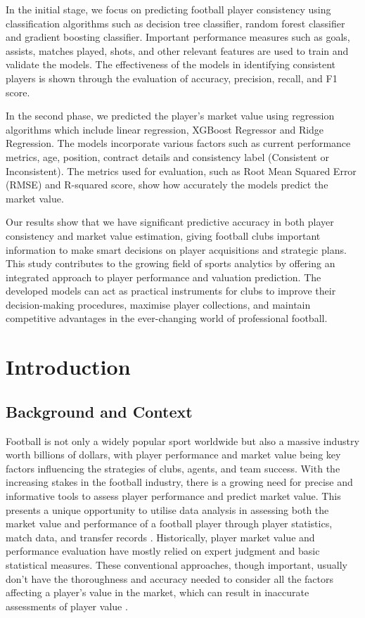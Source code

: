 \documentclass[12pt, a4paper,oneside]{book}
\numberwithin{equation}{section}
\begin{document}
In the initial stage, we focus on predicting football player consistency using classification algorithms such as decision tree classifier, random forest classifier and gradient boosting classifier. Important performance measures such as goals, assists, matches played, shots, and other relevant features are used to train and validate the models. The effectiveness of the models in identifying consistent players is shown through the evaluation of accuracy, precision, recall, and F1 score.

In the second phase, we predicted the player’s market value using regression algorithms which include linear regression, XGBoost Regressor and Ridge Regression. The models incorporate various factors such as current performance metrics, age, position, contract details and consistency label (Consistent or Inconsistent). The metrics used for evaluation, such as Root Mean Squared Error (RMSE) and R-squared score, show how accurately the models predict the market value.

Our results show that we have significant predictive accuracy in both player consistency and market value estimation, giving football clubs important information to make smart decisions on player acquisitions and strategic plans. This study contributes to the growing field of sports analytics by offering an integrated approach to player performance and valuation prediction. The developed models can act as practical instruments for clubs to improve their decision-making procedures, maximise player collections, and maintain competitive advantages in the ever-changing world of professional football.

\tableofcontents
\listoffigures
\listoftables

\chapter{Introduction}\label{ch:1}

\section{Background and Context}\label{sec:1.1}

Football is not only a widely popular sport worldwide but also a massive industry worth billions of dollars, with player performance and market value being key factors influencing the strategies of clubs, agents, and team success. With the increasing stakes in the football industry, there is a growing need for precise and informative tools to assess player performance and predict market value. This presents a unique opportunity to utilise data analysis in assessing both the market value and performance of a football player through player statistics, match data, and transfer records \cite{lopez2018}. Historically, player market value and performance evaluation have mostly relied on expert judgment and basic statistical measures. These conventional approaches, though important, usually don't have the thoroughness and accuracy needed to consider all the factors affecting a player's value in the market, which can result in inaccurate assessments of player value \cite{williams2021}.
\end{document}
